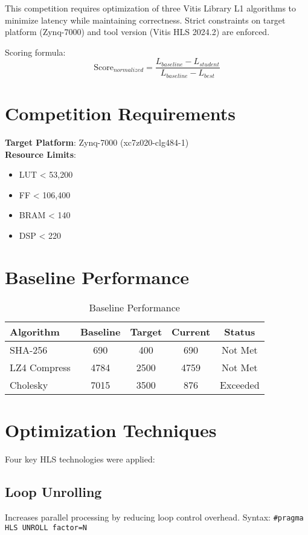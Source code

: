 \documentclass[11pt]{article}
\begin{document}
This competition requires optimization of three Vitis Library L1 algorithms to minimize latency while maintaining correctness. Strict constraints on target platform (Zynq-7000) and tool version (Vitis HLS 2024.2) are enforced.

Scoring formula:
\[
\text{Score}_{normalized} = \frac{L_{baseline} - L_{student}}{L_{baseline} - L_{best}}
\]

\section{Competition Requirements}
\textbf{Target Platform}: Zynq-7000 (xc7z020-clg484-1)\\
\textbf{Resource Limits}:
\begin{itemize}
    \item LUT < 53,200
    \item FF < 106,400
    \item BRAM < 140
    \item DSP < 220
\end{itemize}

\section{Baseline Performance}
\begin{table}[h]
    \centering
    \caption{Baseline Performance}
    \label{tab:baseline}
    \begin{tabular}{lcccc}
        \toprule
        \textbf{Algorithm} & \textbf{Baseline} & \textbf{Target} & \textbf{Current} & \textbf{Status} \\
        \midrule
        SHA-256 & 690 & 400 & 690 & Not Met \\
        LZ4 Compress & 4784 & 2500 & 4759 & Not Met \\
        Cholesky & 7015 & 3500 & 876 & Exceeded \\
        \bottomrule
    \end{tabular}
\end{table}

\section{Optimization Techniques}
Four key HLS technologies were applied:

\subsection{Loop Unrolling}
Increases parallel processing by reducing loop control overhead. Syntax: \texttt{\#pragma HLS UNROLL factor=N}
\end{document}
